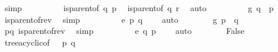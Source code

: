 \begin{isabellebody}
\ simp\isanewline
\ \ \ \ \ \ \isamarkupfalse%
\ \isamarkupfalse%
\ {\isachardoublequoteopen}is{\isacharunderscore}{\kern0pt}parent{\isacharunderscore}{\kern0pt}of\ q\ p{\isachardoublequoteclose}\ \isamarkupfalse%
\ {\isacartoucheopen}is{\isacharunderscore}{\kern0pt}parent{\isacharunderscore}{\kern0pt}of\ q\ r{\isacartoucheclose}\ \isamarkupfalse%
\ auto\isanewline
\ \ \ \ \ \ \isamarkupfalse%
\ \isamarkupfalse%
\ g{}{\isacharcolon}{\kern0pt}\ {\isachardoublequoteopen}{\isasymG}{\isasymlangle}{\isasymrightarrow}q{\isasymrangle}\ {\isacharequal}{\kern0pt}\ {\isacharbraceleft}{\kern0pt}p{\isacharbraceright}{\kern0pt}{\isachardoublequoteclose}\ \isamarkupfalse%
\ is{\isacharunderscore}{\kern0pt}parent{\isacharunderscore}{\kern0pt}of{\isacharunderscore}{\kern0pt}rev\ \isamarkupfalse%
\ simp\isanewline
\ \ \ \ \ \ \isamarkupfalse%
\ \isamarkupfalse%
\ e{}{\isacharcolon}{\kern0pt}\ {\isachardoublequoteopen}{\isacharparenleft}{\kern0pt}p{\isacharcomma}{\kern0pt}\ q{\isacharparenright}{\kern0pt}\ {\isasymin}\ {\isasymG}{\isachardoublequoteclose}\ \isamarkupfalse%
\ auto\isanewline
\ \ \ \ \ \ \isamarkupfalse%
\ g{}{\isacharcolon}{\kern0pt}\ {\isachardoublequoteopen}{\isasymG}{\isasymlangle}{\isasymrightarrow}p{\isasymrangle}\ {\isacharequal}{\kern0pt}\ {\isacharbraceleft}{\kern0pt}q{\isacharbraceright}{\kern0pt}{\isachardoublequoteclose}\ \isamarkupfalse%
\ pq\ is{\isacharunderscore}{\kern0pt}parent{\isacharunderscore}{\kern0pt}of{\isacharunderscore}{\kern0pt}rev\ \isamarkupfalse%
\ simp\isanewline
\ \ \ \ \ \ \isamarkupfalse%
\ \isamarkupfalse%
\ e{}{\isacharcolon}{\kern0pt}\ {\isachardoublequoteopen}{\isacharparenleft}{\kern0pt}q{\isacharcomma}{\kern0pt}\ p{\isacharparenright}{\kern0pt}\ {\isasymin}\ {\isasymG}{\isachardoublequoteclose}\ \isamarkupfalse%
\ auto\isanewline
\ \ \ \ \ \ \isamarkupfalse%
\ {\isachardoublequoteopen}False{\isachardoublequoteclose}\ \isamarkupfalse%
\ tree{\isacharunderscore}{\kern0pt}acyclic{\isacharbrackleft}{\kern0pt}of\ {\isachardoublequoteopen}{\isasymP}{\isachardoublequoteclose}\ {\isachardoublequoteopen}{\isasymG}{\isachardoublequoteclose}\ p\ q{\isacharbrackright}{\kern0pt}\ \isamarkupfalse%

\end{isabellebody}
